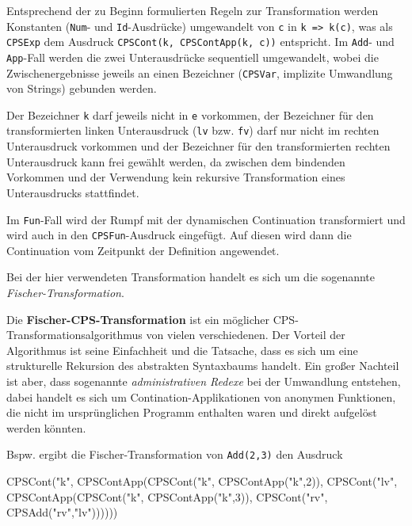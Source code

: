 \documentclass[]{article}
\newenvironment{Shaded}{}{}
\newcommand{\DecValTok}[1]{\textcolor[rgb]{0.25,0.63,0.44}{#1}}
\newcommand{\FunctionTok}[1]{\textcolor[rgb]{0.02,0.16,0.49}{#1}}
\newcommand{\NormalTok}[1]{#1}
\newcommand{\StringTok}[1]{\textcolor[rgb]{0.25,0.44,0.63}{#1}}
\begin{document}
Entsprechend der zu Beginn formulierten Regeln zur Transformation werden
Konstanten (\texttt{Num}- und \texttt{Id}-Ausdrücke) umgewandelt von
\texttt{c} in \texttt{k\ =\textgreater{}\ k(c)}, was als \texttt{CPSExp}
dem Ausdruck \texttt{CPSCont(k,\ CPSContApp(k,\ c))} entspricht. Im
\texttt{Add}- und \texttt{App}-Fall werden die zwei Unterausdrücke
sequentiell umgewandelt, wobei die Zwischenergebnisse jeweils an einen
Bezeichner (\texttt{CPSVar}, implizite Umwandlung von Strings) gebunden
werden.

Der Bezeichner \texttt{k} darf jeweils nicht in \texttt{e} vorkommen,
der Bezeichner für den transformierten linken Unterausdruck (\texttt{lv}
bzw. \texttt{fv}) darf nur nicht im rechten Unterausdruck vorkommen und
der Bezeichner für den transformierten rechten Unterausdruck kann frei
gewählt werden, da zwischen dem bindenden Vorkommen und der Verwendung
kein rekursive Transformation eines Unterausdrucks stattfindet.

Im \texttt{Fun}-Fall wird der Rumpf mit der dynamischen Continuation
transformiert und wird auch in den \texttt{CPSFun}-Ausdruck eingefügt.
Auf diesen wird dann die Continuation vom Zeitpunkt der Definition
angewendet.

Bei der hier verwendeten Transformation handelt es sich um die
sogenannte \emph{Fischer-Transformation}.

Die \textbf{Fischer-CPS-Transformation} ist ein möglicher
CPS-Transformationsalgorithmus von vielen verschiedenen. Der Vorteil der
Algorithmus ist seine Einfachheit und die Tatsache, dass es sich um eine
strukturelle Rekursion des abstrakten Syntaxbaums handelt. Ein großer
Nachteil ist aber, dass sogenannte \emph{administrativen Redexe} bei der
Umwandlung entstehen, dabei handelt es sich um Contination-Applikationen
von anonymen Funktionen, die nicht im ursprünglichen Programm enthalten
waren und direkt aufgelöst werden könnten.

Bspw. ergibt die Fischer-Transformation von \texttt{Add(2,3)} den
Ausdruck

\begin{Shaded}
\begin{Highlighting}[]
\FunctionTok{CPSCont}\NormalTok{(}\StringTok{"k"}\NormalTok{, }\FunctionTok{CPSContApp}\NormalTok{(}\FunctionTok{CPSCont}\NormalTok{(}\StringTok{"k"}\NormalTok{, }\FunctionTok{CPSContApp}\NormalTok{(}\StringTok{"k"}\NormalTok{,}\DecValTok{2}\NormalTok{)),}
  \FunctionTok{CPSCont}\NormalTok{(}\StringTok{"lv"}\NormalTok{, }\FunctionTok{CPSContApp}\NormalTok{(}\FunctionTok{CPSCont}\NormalTok{(}\StringTok{"k"}\NormalTok{, }\FunctionTok{CPSContApp}\NormalTok{(}\StringTok{"k"}\NormalTok{,}\DecValTok{3}\NormalTok{)),}
    \FunctionTok{CPSCont}\NormalTok{(}\StringTok{"rv"}\NormalTok{, }\FunctionTok{CPSAdd}\NormalTok{(}\StringTok{"rv"}\NormalTok{,}\StringTok{"lv"}\NormalTok{))))))}
\end{Highlighting}
\end{Shaded}
\end{document}
